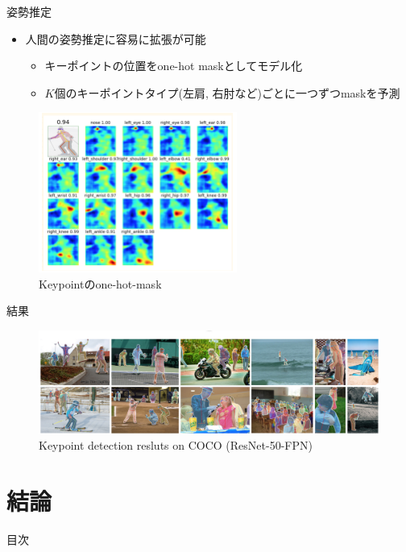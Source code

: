 \documentclass[aspectratio=169, dvipdfmx, 11pt]{beamer}
\begin{document}
\begin{frame}{姿勢推定}
    \begin{itemize}
        \item 人間の姿勢推定に容易に拡張が可能
        \begin{itemize}
            \item キーポイントの位置をone-hot maskとしてモデル化 \\
            \item $K$個のキーポイントタイプ(左肩, 右肘など)ごとに一つずつmaskを予測 \\
        \end{itemize}
    \end{itemize}
    \begin{figure}[htbp]
        \centering
		\includegraphics[width=6.5cm]{./figures/one_hot_mask.png}
        \caption{Keypointのone-hot-mask}
    \end{figure}
\end{frame}

\begin{frame}{結果}
    \begin{figure}[htbp]
        \centering
        \includegraphics[width=12cm]{./figures/keypoint_coco.png}
        \caption{Keypoint detection resluts on COCO (ResNet-50-FPN)}
    \end{figure}
\end{frame}


\section{結論}
\begin{frame}{目次}
    \tableofcontents[currentsection]
\end{frame}
\end{document}
